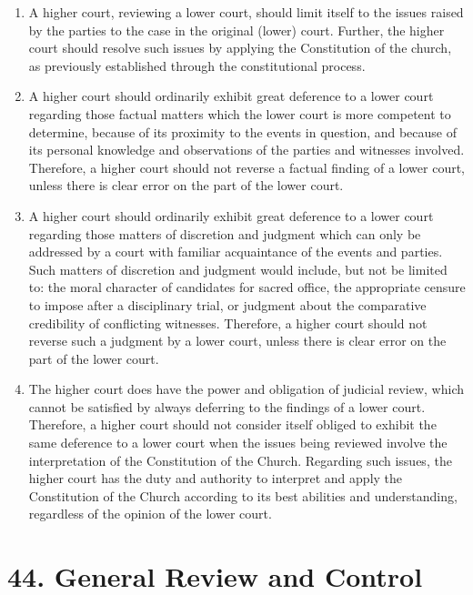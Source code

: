 \documentclass[
]{book}
\providecommand{\tightlist}{%
  \setlength{\itemsep}{0pt}\setlength{\parskip}{0pt}}
\begin{document}
\begin{enumerate}
  \begin{enumerate}
  \def\labelenumii{\alph{enumii}.}
  \tightlist
  \item
    A higher court, reviewing a lower court, should limit itself to the issues raised by the parties to the case in the original (lower) court. Further, the higher court should resolve such issues by applying the Constitution of the church, as previously established through the constitutional process.
  \item
    A higher court should ordinarily exhibit great deference to a lower court regarding those factual matters which the lower court is more competent to determine, because of its proximity to the events in question, and because of its personal knowledge and observations of the parties and witnesses involved. Therefore, a higher court should not reverse a factual finding of a lower court, unless there is clear error on the part of the lower court.
  \item
    A higher court should ordinarily exhibit great deference to a lower court regarding those matters of discretion and judgment which can only be addressed by a court with familiar acquaintance of the events and parties. Such matters of discretion and judgment would include, but not be limited to: the moral character of candidates for sacred office, the appropriate censure to impose after a disciplinary trial, or judgment about the comparative credibility of conflicting witnesses. Therefore, a higher court should not reverse such a judgment by a lower court, unless there is clear error on the part of the lower court.
  \item
    The higher court does have the power and obligation of judicial review, which cannot be satisfied by always deferring to the findings of a lower court. Therefore, a higher court should not consider itself obliged to exhibit the same deference to a lower court when the issues being reviewed involve the interpretation of the Constitution of the Church. Regarding such issues, the higher court has the duty and authority to interpret and apply the Constitution of the Church according to its best abilities and understanding, regardless of the opinion of the lower court.
  \end{enumerate}
\end{enumerate}

\hypertarget{general-review-and-control}{%
\section*{44. General Review and Control}\label{general-review-and-control}}
\end{document}
